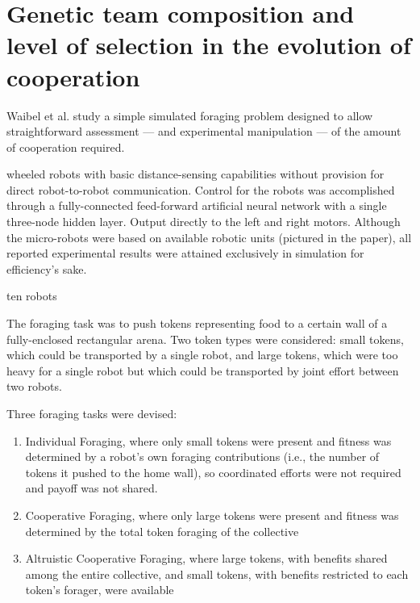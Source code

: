 \section{Genetic team composition and level of selection in the evolution of cooperation \cite{waibel2009genetic}}

Waibel et al. study a simple simulated foraging problem designed to allow straightforward assessment --- and experimental manipulation --- of the amount of cooperation required.

wheeled robots with basic distance-sensing capabilities without provision for direct robot-to-robot communication.
Control for the robots was accomplished through a fully-connected feed-forward artificial neural network with a single three-node hidden layer.
Output directly to the left and right motors.
Although the micro-robots were based on available robotic units (pictured in the paper), all reported experimental results were attained exclusively in simulation for efficiency's sake.

ten robots

The foraging task was to push tokens representing food to a certain wall of a fully-enclosed rectangular arena.
Two token types were considered: small tokens, which could be transported by a single robot, and large tokens, which were too heavy for a single robot but which could be transported by joint effort between two robots.

Three foraging tasks were devised:
\begin{enumerate}
\item Individual Foraging, where only small tokens were present and fitness was determined by a robot's own foraging contributions (i.e., the number of tokens it pushed to the home wall), so coordinated efforts were not required and payoff was not shared.
\item Cooperative Foraging, where only large tokens were present and fitness was determined by the total token foraging of the collective
\item Altruistic Cooperative Foraging, where large tokens, with benefits shared among the entire collective, and small tokens, with benefits restricted to each token's forager, were available
\end{enumerate}
